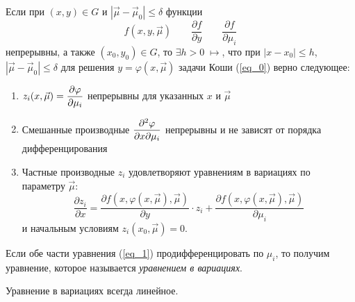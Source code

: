 \Th Если при $(x,y)\in G$ и $|\vec{\mu} - \vec{\mu}_0| \leqslant \delta$ функции \[f(x,y,\vec{\mu}) \qquad \frac{\partial f}{\partial y} \qquad \frac{\partial f}{\partial \mu_i}\]
непрерывны, а также $(x_0,y_0)\in G$, то $\exists h > 0 \;\mapsto$, что при  $|x-x_0|\leqslant h$, $|\vec{\mu}-\vec{\mu}_0|\leqslant \delta$ для решения $y = \varphi(x,\vec{\mu})$ задачи Коши (\ref{eq_0}) верно следующее:
\begin{enumerate}
    \item $z_i(x,\vec{\mu}) = \mathlarger{\frac{\partial \varphi}{\partial\mu_i}}$ непрерывны для указанных $x$ и $\vec{\mu}$
    \item  Смешанные производные $\mathlarger{\frac{\partial^2\varphi}{\partial x \partial \mu_i}}$ непрерывны и не зависят от порядка дифференцирования
    \item  Частные производные $z_i$ удовлетворяют уравнениям в вариациях по параметру $\vec{\mu}$:
    \begin{equation}\label{eq_1}
    \frac{\partial z_i}{\partial x}= \frac{\partial f(x, \varphi(x, \vec{\mu}), \vec{\mu})}{\partial y}\cdot z_i + \frac{\partial f(x, \varphi(x, \vec{\mu}), \vec{\mu})}{\partial\mu_i}
    \end{equation}
    и  начальным условиям $z_i(x_0,\vec{\mu}) = 0$.
\end{enumerate}

\Def Если обе части уравнения (\ref{eq_1}) продифференцировать по $\mu_i$, то получим уравнение, которое называется \textit{уравнением в вариациях}.

\Note Уравнение в вариациях всегда линейное.